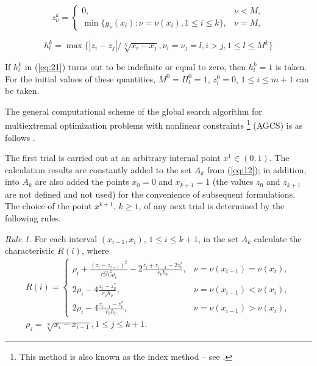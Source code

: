 \documentclass[smallextended]{svjour3}       %
\begin{document}
\begin{equation}\label{eq:20}
z^k_\nu = 
 \begin{cases}
   0, & \nu < M, \\
   \min{\{g_\nu(x_i):\nu=\nu(x_i), 1\leq i \leq k \}}, & \nu = M,
 \end{cases}
\end{equation}

\begin{equation}\label{eq:21}
h^k_l=\max{\{|z_i-z_j|/\sqrt[N]{x_i-x_j},\nu_i=\nu_j=l,i>j,1\leq l\leq M^k\}}
\end{equation}

If $h_l^k$ in (\ref{eq:21}) turns out to be indefinite or equal to zero, then $h_l^k=1$ is taken. For the initial values of these quantities, $M^0 = H_l^0=1$, $z_l^0=0$, $1 \leq i \leq m+1$ can be taken.

The general computational scheme of the global search algorithm for multiextremal optimization problems with nonlinear constraints \footnote{This method is also known as the index method -- see \cite{c18}.} (AGCS) is as follows \cite{c18}.

The first trial is carried out at an arbitrary internal point $x^1\in (0,1)$. The calculation results are constantly added to the set $A_k$ from (\ref{eq:12}); in addition, into $A_k$ are also added the points $x_0=0$ and $x_{k+1}=1$ (the values $z_0$ and $z_{k+1}$ are not defined and not used) for the convenience of subsequent formulations. The choice of the point $x^{k+1}$, $k\geq 1$, of any next trial is determined by the following rules.

\textit{Rule 1.} For each interval $(x_{i-1},x_i)$, $1 \leq i \leq k+1$, in the set $A_k$ calculate the characteristic $R(i)$, where
\begin{equation}\label{eq:22}
\begin{matrix}
R(i) = 
 \begin{cases}
   \rho_i + \frac{(z_i-z_{i-1})^2}{r^2_\nu h^2_\nu \rho_i} - 2 \frac{z_i+z_{i-1}-2z^*_\nu}{r_\nu h_\nu}, & \nu=\nu(x_{i-1})=\nu(x_i), \\
   2 \rho_i - 4\frac{z_i-z^*_\nu}{r_\nu h_\nu}, & \nu=\nu(x_{i-1})<\nu(x_i), \\
2 \rho_i - 4\frac{z_{i-1}-z^*_\nu}{r_\nu h_\nu}, & \nu=\nu(x_{i-1})>\nu(x_i), 
 \end{cases} \\
\rho_j = \sqrt[N]{x_i-x_{i-1}}, 1\leq j\leq k+1.
\end{matrix}
\end{equation}
\end{document}
